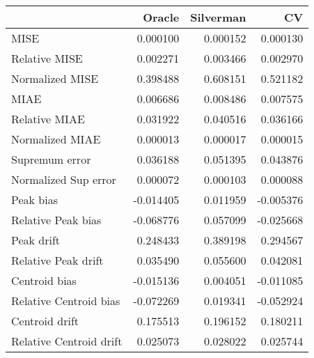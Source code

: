 \begin{tabular}{lrrr}
  \toprule
 & Oracle & Silverman & CV \\ 
  \midrule
MISE & 0.000100 & 0.000152 & 0.000130 \\ 
  Relative MISE & 0.002271 & 0.003466 & 0.002970 \\ 
  Normalized MISE & 0.398488 & 0.608151 & 0.521182 \\ 
  MIAE & 0.006686 & 0.008486 & 0.007575 \\ 
  Relative MIAE & 0.031922 & 0.040516 & 0.036166 \\ 
  Normalized MIAE & 0.000013 & 0.000017 & 0.000015 \\ 
  Supremum error & 0.036188 & 0.051395 & 0.043876 \\ 
  Normalized Sup error & 0.000072 & 0.000103 & 0.000088 \\ 
  Peak bias & -0.014405 & 0.011959 & -0.005376 \\ 
  Relative Peak bias & -0.068776 & 0.057099 & -0.025668 \\ 
  Peak drift & 0.248433 & 0.389198 & 0.294567 \\ 
  Relative Peak drift & 0.035490 & 0.055600 & 0.042081 \\ 
  Centroid bias & -0.015136 & 0.004051 & -0.011085 \\ 
  Relative Centroid bias & -0.072269 & 0.019341 & -0.052924 \\ 
  Centroid drift & 0.175513 & 0.196152 & 0.180211 \\ 
  Relative Centroid drift & 0.025073 & 0.028022 & 0.025744 \\ 
   \bottomrule
\end{tabular}
